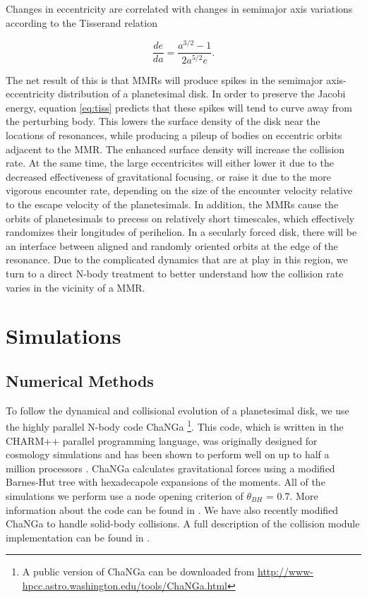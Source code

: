\documentclass[twocolumn]{aastex63}
\begin{document}
Changes in eccentricity are correlated with changes in semimajor axis variations according to the Tisserand relation

\begin{equation}\label{eq:tiss}
	\frac{de}{da} = \frac{a^{3/2} - 1}{2 a^{5/2} e}.
\end{equation}

The net result of this is that MMRs will produce spikes in the semimajor axis-eccentricity distribution of a planetesimal disk. In order to 
preserve the Jacobi energy, equation \ref{eq:tiss} predicts that these spikes will tend to curve away from the perturbing body. This lowers the 
surface density of the disk near the locations of resonances, while producing a pileup of bodies on eccentric orbits adjacent to the MMR. The 
enhanced surface density will increase the collision rate. At the same time, the large eccentricites will either lower it due to the decreased 
effectiveness of gravitational focusing, or raise it due to the more vigorous encounter rate, depending on the size of the encounter velocity relative to 
the escape velocity of the planetesimals. In addition, the MMRs cause the orbits of planetesimals to precess on relatively short 
timescales, which effectively randomizes their longitudes of perihelion. In a secularly forced disk, there will be an interface between aligned 
and randomly oriented orbits at the edge of the resonance. Due to the complicated dynamics that are at play in this region, we turn to a direct 
N-body treatment to better understand how the collision rate varies in the vicinity of a MMR.

\section{Simulations} \label{sec:sims}

\subsection{Numerical Methods}\label{sec:methods}

To follow the dynamical and collisional evolution of a planetesimal disk, we use the highly parallel N-body code {\sc ChaNGa} 
\footnote{A public version of {\sc ChaNGa} can be downloaded from \url{http://www-hpcc.astro.washington.edu/tools/ChaNGa.html}}. 
This code, which is written in the {\sc CHARM++} parallel programming language, was originally designed for cosmology simulations 
and has been shown to perform well on up to half a million processors \citep{2015AphCom..2..1}. {\sc ChaNGa} calculates 
gravitational forces using a modified Barnes-Hut \citep{1986Natur.324..446B} tree with hexadecapole expansions of the moments. 
All of the simulations we perform use a node opening criterion of $\theta_{BH}$ = 0.7. More information about the code can be found 
in \citet{2008IEEEpds...ChaNGa}. We have also recently modified {\sc ChaNGa} to handle solid-body collisions. A full description of 
the collision module implementation can be found in \citet{2019MNRAS.489.2159W}.
\end{document}
